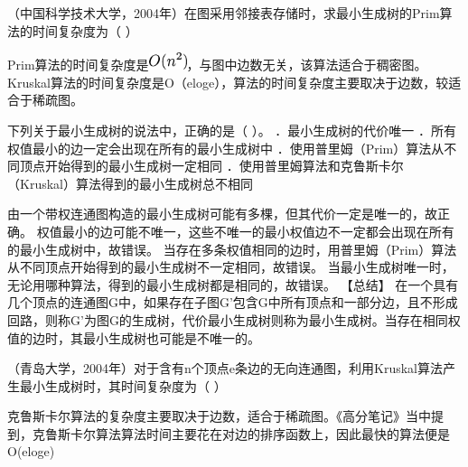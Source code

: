 \question （中国科学技术大学，2004年）在图采用邻接表存储时，求最小生成树的Prim算法的时间复杂度为（
）
\par\fourch{}{}{\textcolor{red}{}}{}
\begin{solution}Prim算法的时间复杂度是\includegraphics[width=0.43750in,height=0.19792in]{texmath/ead2f65Cdpi7B3507DO28n5E229}，与图中边数无关，该算法适合于稠密图。Kruskal算法的时间复杂度是O（eloge），算法的时间复杂度主要取决于边数，较适合于稀疏图。
\end{solution}
\question 下列关于最小生成树的说法中，正确的是（ ）。 ．最小生成树的代价唯一
．所有权值最小的边一定会出现在所有的最小生成树中
．使用普里姆（Prim）算法从不同顶点开始得到的最小生成树一定相同
．使用普里姆算法和克鲁斯卡尔（Kruskal）算法得到的最小生成树总不相同
\par{}
\begin{solution}由一个带权连通图构造的最小生成树可能有多棵，但其代价一定是唯一的，故正确。
权值最小的边可能不唯一，这些不唯一的最小权值边不一定都会出现在所有的最小生成树中，故错误。
当存在多条权值相同的边时，用普里姆（Prim）算法从不同顶点开始得到的最小生成树不一定相同，故错误。
当最小生成树唯一时，无论用哪种算法，得到的最小生成树都是相同的，故错误。
【总结】
在一个具有几个顶点的连通图G中，如果存在子图G'包含G中所有顶点和一部分边，且不形成回路，则称G'为图G的生成树，代价最小生成树则称为最小生成树。当存在相同权值的边时，其最小生成树也可能是不唯一的。
\end{solution}
\question （青岛大学，2004年）对于含有n个顶点e条边的无向连通图，利用Kruskal算法产生最小生成树时，其时间复杂度为（
）
\par{}
\begin{solution}克鲁斯卡尔算法的复杂度主要取决于边数，适合于稀疏图。《高分笔记》当中提到，克鲁斯卡尔算法算法时间主要花在对边的排序函数上，因此最快的算法便是O(eloge)
\end{solution}
